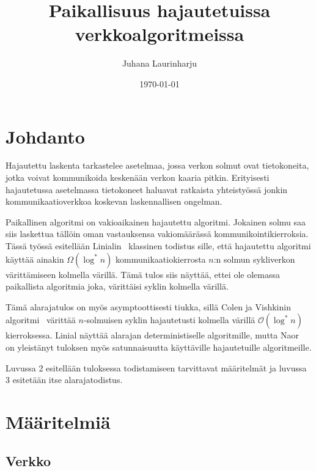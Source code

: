 \documentclass[finnish]{tktltiki2}
\title{Paikallisuus hajautetuissa verkkoalgoritmeissa}
\author{Juhana Laurinharju}
\date{\today}
\theoremstyle{definition}
\theoremstyle{remark}
\begin{document}

\maketitle        %
\makeabstract     %

\tableofcontents  %
\newpage          %



\section{Johdanto}

Hajautettu laskenta tarkastelee asetelmaa, jossa verkon solmut ovat
tietokoneita, jotka voivat kommunikoida keskenään verkon kaaria pitkin.
Erityisesti hajautetussa asetelmassa tietokoneet haluavat ratkaista
yhteistyössä jonkin kommunikaatioverkkoa koskevan laskennallisen ongelman.

Paikallinen algoritmi on vakioaikainen hajautettu algoritmi. Jokainen solmu saa
siis laskettua tällöin oman vastauksensa vakiomäärässä kommunikointikierroksia.
Tässä työssä esitellään Linialin~\cite{linial92} klassinen todistus sille, että
hajautettu algoritmi käyttää ainakin $\Omega(\log^* n)$ kommunikaatiokierrosta
$n$:n solmun sykliverkon värittämiseen kolmella värillä. Tämä tulos siis
näyttää, ettei ole olemassa paikallista algoritmia joka, värittäisi syklin
kolmella värillä.

Tämä alarajatulos on myös asymptoottisesti tiukka, sillä Colen ja Vishkinin
algoritmi~\cite{colevishkin86} värittää $n$-solmuisen syklin hajautetusti
kolmella värillä $\mathcal{O}(\log^* n)$ kierroksessa. Linial näyttää alarajan
deterministiselle algoritmille, mutta Naor~\cite{naor91} on yleistänyt tuloksen
myös satunnaisuutta käyttäville hajautetuille algoritmeille.

Luvussa 2 esitellään tuloksessa todistamiseen tarvittavat määritelmät ja
luvussa 3 esitetään itse alarajatodistus.

\section{Määritelmiä}

\subsection{Verkko}
\end{document}
